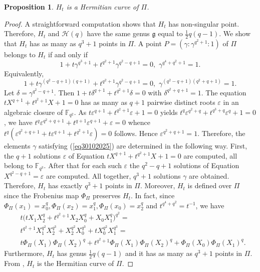 \documentclass[9pt]{article}
\theoremstyle{plain}
\newtheorem{prop}[thm]{Proposition}
\begin{document}
\begin{prop}
\label{pro30102025} $H_t$ is a Hermitian curve of $\Pi$.
\end{prop}
\begin{proof} A straightforward computation shows that $H_t$ has non-singular point. Therefore, $H_t$ and ${\mathcal{H}}(q)$ have the same genus $\mathfrak{g}$ equal to $\frac{1}{2}q(q-1)$. We show that $H_t$ has as many as $q^3+1$ points in $\Pi$. A point $P=(\gamma:\gamma^{q^2+1}:1)$ of $\Pi$ belongs to $H_t$ if and only if
\begin{equation}
\label{eq30102025}
1+t\gamma^{q^3+1}+t^{q^2+1}\gamma^{q^2-q+1}=0,\,\, \gamma^{q^4+q^2+1}=1.
\end{equation}
Equivalently,
$$1+t\gamma^{(q^2-q+1)(q+1)}+t^{q^2+1}\gamma^{q^2-q+1}=0,\,\,\gamma^{(q^2-q+1)(q^2+q+1)}=1.$$
Let $\delta=\gamma^{q^2-q+1}$. Then $1+t\delta^{q+1}+t^{q^2+1}\delta=0$ with $\delta^{q^2+q+1}=1.$
The equation $tX^{q+1}+t^{q^2+1}X+1=0$ has as many as $q+1$ pairwise distinct roots $\varepsilon$ in an algebraic closure of $\mathbb{F}_{q^2}$. As $t\varepsilon^{q+1}+t^{q^2+1}\varepsilon+1=0$ yields $t^q\varepsilon^{q^2+q}+t^{q^3+q}\varepsilon^q+1=0$, we have $t^q\varepsilon^{q^2+q+1}+t^{q+1}\varepsilon^{q+1}+\varepsilon=0$ whence $t^q(\varepsilon^{q^2+q+1}+t\varepsilon^{q+1}+t^{q^2+1}\varepsilon)=0$ follows. Hence 
$\varepsilon^{q^2+q+1}=1$. Therefore, the elements $\gamma$ satisfying (\ref{eq30102025}) are determined in the following way. First, the $q+1$ solutions $\varepsilon$ of Equation $tX^{q+1}+t^{q^2+1}X+1=0$ are computed, all belong to $\mathbb{F}_{q^3}$. After that for each such $\varepsilon$ the $q^2-q+1$ solutions of Equation $X^{q^2-q+1}=\varepsilon$ are computed. All together, $q^3+1$ solutions $\gamma$ are obtained. Therefore, $H_t$ has exactly $q^3+1$ points in $\Pi$. Moreover, $H_t$ is defined over $\Pi$ since the Frobenius map $\Phi_{\Pi}$ preserves $H_t$. In fact, since $\Phi_{\Pi}(x_1)=x_0^q,\Phi_{\Pi}(x_2)=x_1^q, \Phi_{\Pi}(x_0)=x_2^q$ and  
$t^{q^4+q^2}=t^{-1}$, we have
\begin{align*}
&t\big(tX_1X_2^q+t^{q^2+1}X_2X_0^q+X_0X_1^q\big)^{q^2}=\\
&t^{q^2+1}X_1^{q^2}X_2^{q^3}+X_2^{q^2}X_0^{q^3}+tX_0^{q^2}X_1^{q^3}=\\
&t\Phi_{\Pi}(X_1)\Phi_{\Pi}(X_2)^q+t^{q^2+1}\Phi_{\Pi}(X_1)\Phi_{\Pi}(X_2)^q+\Phi_{\Pi}(X_0)\Phi_{\Pi}(X_1)^q.
\end{align*}
Furthermore, $H_t$ has genus $\frac{1}{2}q(q-1)$ and it has as many as $q^3+1$ points in $\Pi$. From \cite{hirschfeld-storme-thas-voloch1991}, $H_t$ is the Hermitian curve of $\Pi$.
\end{proof}
\end{document}
